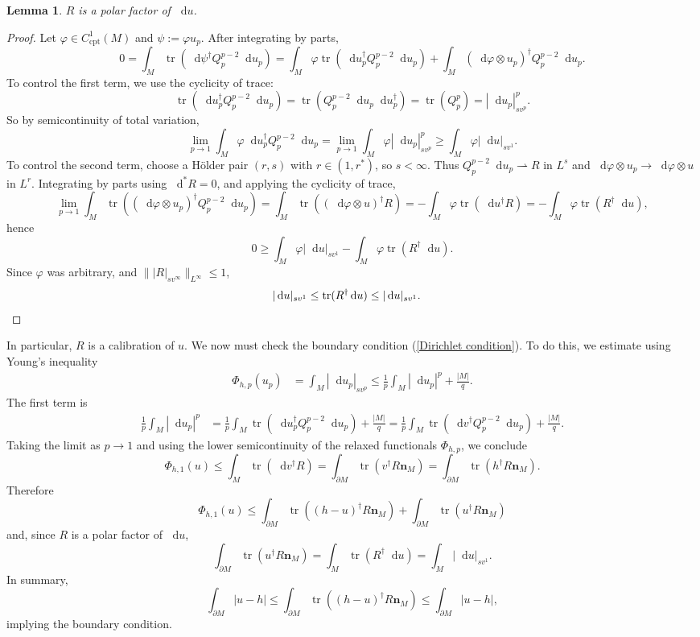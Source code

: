 \documentclass[reqno,11pt]{amsart}
\newcommand*\dif{\mathop{}\!\mathrm{d}}
\DeclareMathOperator{\tr}{tr}
\newcommand{\normal}{\mathbf n}
\newcommand{\cpt}{\mathrm{cpt}}
\newtheorem{lemma}[theorem]{Lemma}
\theoremstyle{definition}
\numberwithin{equation}{section}
\begin{document}
\begin{lemma}
$R$ is a polar factor of $\dif u$.
\end{lemma}
\begin{proof}
Let $\varphi \in C^1_\cpt(M)$ and $\psi := \varphi u_p$.
After integrating by parts,
$$0 = \int_M \tr(\dif \psi^\dagger Q_p^{p - 2} \dif u_p) = \int_M \varphi \tr(\dif u_p^\dagger Q_p^{p - 2} \dif u_p) + \int_M (\dif \varphi \otimes u_p)^\dagger Q_p^{p - 2} \dif u_p.$$
To control the first term, we use the cyclicity of trace:
$$\tr(\dif u_p^\dagger Q_p^{p - 2} \dif u_p) = \tr(Q_p^{p - 2} \dif u_p \dif u_p^\dagger) = \tr(Q_p^p) = |\dif u_p|_{sv^p}^p.$$
So by semicontinuity of total variation,
$$\lim_{p \to 1} \int_M \varphi \dif u_p^\dagger Q_p^{p - 2} \dif u_p = \lim_{p \to 1} \int_M \varphi |\dif u_p|_{sv^p}^p \geq \int_M \varphi |\dif u|_{sv^1}.$$
To control the second term, choose a H\"older pair $(r, s)$ with $r \in (1, r^*)$, so $s < \infty$.
Thus $Q_p^{p - 2} \dif u_p \rightharpoonup R$ in $L^s$ and $\dif \varphi \otimes u_p \to \dif \varphi \otimes u$ in $L^r$.
Integrating by parts using $\dif^* R = 0$, and applying the cyclicity of trace,
$$\lim_{p \to 1} \int_M \tr((\dif \varphi \otimes u_p)^\dagger Q_p^{p - 2} \dif u_p) = \int_M \tr((\dif \varphi \otimes u)^\dagger R) = -\int_M \varphi \tr(\dif u^\dagger R) = -\int_M \varphi \tr(R^\dagger \dif u),$$
hence
$$0 \geq \int_M \varphi |\dif u|_{sv^1} - \int_M \varphi \tr(R^\dagger \dif u).$$
Since $\varphi$ was arbitrary, and $\||R|_{sv^\infty}\|_{L^\infty} \leq 1$,
\begin{align*}
|\dif u|_{sv^1} &\leq \tr(R^\dagger \dif u) \leq |\dif u|_{sv^1}. \qedhere
\end{align*}
\end{proof}

In particular, $R$ is a calibration of $u$.
We now must check the boundary condition (\ref{Dirichlet condition}).
To do this, we estimate using Young's inequality
\begin{align*}
\Phi_{h, p}(u_p)
&= \int_M |\dif u_p|_{sv^p} 
\leq \frac{1}{p} \int_M |\dif u_p|^p + \frac{|M|}{q}.
\end{align*}
The first term is
\begin{align*}
\frac{1}{p} \int_M |\dif u_p|^p
&= \frac{1}{p} \int_M \tr(\dif u_p^\dagger Q_p^{p - 2} \dif u_p) + \frac{|M|}{q} 
= \frac{1}{p} \int_M \tr(\dif v^\dagger Q_p^{p - 2} \dif u_p) + \frac{|M|}{q}.
\end{align*}
Taking the limit as $p \to 1$ and using the lower semicontinuity of the relaxed functionals $\Phi_{h, p}$, we conclude 
$$\Phi_{h, 1}(u) \leq \int_M \tr(\dif v^\dagger R) = \int_{\partial M} \tr(v^\dagger R\normal_M) = \int_{\partial M} \tr(h^\dagger R\normal_M).$$
Therefore 
$$\Phi_{h, 1}(u) \leq \int_{\partial M} \tr((h - u)^\dagger R\normal_M) + \int_{\partial M} \tr(u^\dagger R\normal_M)$$
and, since $R$ is a polar factor of $\dif u$,
$$\int_{\partial M} \tr(u^\dagger R\normal_M) = \int_M \tr(R^\dagger \dif u) = \int_M |\dif u|_{sv^1}.$$
In summary,
$$\int_{\partial M} |u - h| \leq \int_{\partial M} \tr((h - u)^\dagger R\normal_M) \leq \int_{\partial M} |u - h|,$$
implying the boundary condition.
\end{document}
